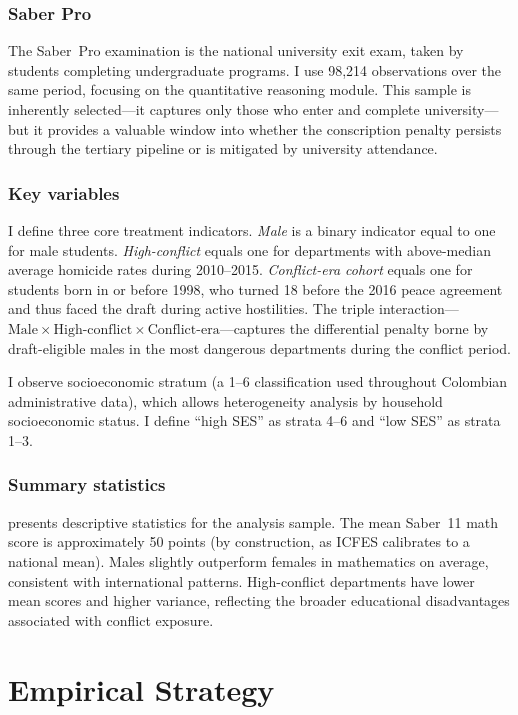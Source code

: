 \documentclass[12pt]{article}
\begin{document}
\subsubsection*{Saber Pro} The Saber~Pro examination is the national university exit exam, taken by students completing undergraduate programs. I use 98,214 observations over the same period, focusing on the quantitative reasoning module. This sample is inherently selected---it captures only those who enter and complete university---but it provides a valuable window into whether the conscription penalty persists through the tertiary pipeline or is mitigated by university attendance.

\subsubsection*{Key variables} I define three core treatment indicators. \textit{Male} is a binary indicator equal to one for male students. \textit{High-conflict} equals one for departments with above-median average homicide rates during 2010--2015. \textit{Conflict-era cohort} equals one for students born in or before 1998, who turned 18 before the 2016 peace agreement and thus faced the draft during active hostilities. The triple interaction---$\text{Male} \times \text{High-conflict} \times \text{Conflict-era}$---captures the differential penalty borne by draft-eligible males in the most dangerous departments during the conflict period.

I observe socioeconomic stratum (a 1--6 classification used throughout Colombian administrative data), which allows heterogeneity analysis by household socioeconomic status. I define ``high SES'' as strata 4--6 and ``low SES'' as strata 1--3.

\subsubsection*{Summary statistics}  presents descriptive statistics for the analysis sample. The mean Saber~11 math score is approximately 50 points (by construction, as ICFES calibrates to a national mean). Males slightly outperform females in mathematics on average, consistent with international patterns. High-conflict departments have lower mean scores and higher variance, reflecting the broader educational disadvantages associated with conflict exposure.




\section{Empirical Strategy}
\end{document}
